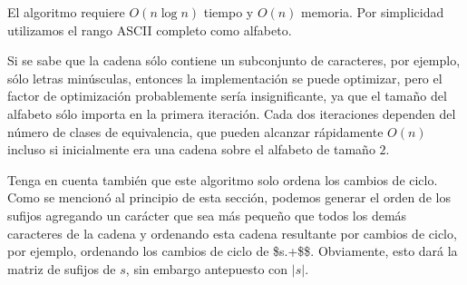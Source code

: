 El algoritmo requiere $O(n\log n)$ tiempo y $O(n)$ memoria. Por simplicidad utilizamos el rango ASCII completo como alfabeto.

Si se sabe que la cadena sólo contiene un subconjunto de caracteres, por ejemplo, sólo letras minúsculas, entonces la implementación se puede optimizar, pero 
el factor de optimización probablemente sería insignificante, ya que el tamaño del alfabeto sólo importa en la primera iteración. Cada dos iteraciones dependen 
del número de clases de equivalencia, que pueden alcanzar rápidamente $O(n)$ incluso si inicialmente era una cadena sobre el alfabeto de tamaño $2$.

Tenga en cuenta también que este algoritmo solo ordena los cambios de ciclo. Como se mencionó al principio de esta sección, podemos generar el orden de los 
sufijos agregando un carácter que sea más pequeño que todos los demás caracteres de la cadena y ordenando esta cadena resultante por cambios de ciclo, por  ejemplo, ordenando los cambios de ciclo de \$s.+\$\$. Obviamente, esto dará la matriz de sufijos de $s$, sin embargo antepuesto con $|s|$.



